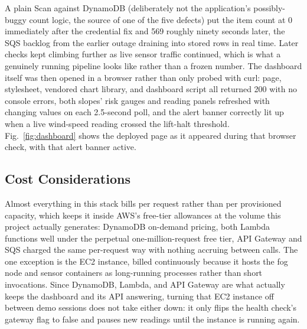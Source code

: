 \documentclass[conference]{IEEEtran}
\begin{document}
A plain Scan against DynamoDB (deliberately not the application's possibly-buggy count logic, the source of one of the five defects) put the item count at 0 immediately after the credential fix and 569 roughly ninety seconds later, the SQS backlog from the earlier outage draining into stored rows in real time. Later checks kept climbing further as live sensor traffic continued, which is what a genuinely running pipeline looks like rather than a frozen number. The dashboard itself was then opened in a browser rather than only probed with curl: page, stylesheet, vendored chart library, and dashboard script all returned 200 with no console errors, both slopes' risk gauges and reading panels refreshed with changing values on each 2.5-second poll, and the alert banner correctly lit up when a live wind-speed reading crossed the lift-halt threshold. Fig.~\ref{fig:dashboard} shows the deployed page as it appeared during that browser check, with that alert banner active.

\subsection{Cost Considerations}
Almost everything in this stack bills per request rather than per provisioned capacity, which keeps it inside AWS's free-tier allowances at the volume this project actually generates: DynamoDB on-demand pricing, both Lambda functions well under the perpetual one-million-request free tier, API Gateway and SQS charged the same per-request way with nothing accruing between calls. The one exception is the EC2 instance, billed continuously because it hosts the fog node and sensor containers as long-running processes rather than short invocations. Since DynamoDB, Lambda, and API Gateway are what actually keeps the dashboard and its API answering, turning that EC2 instance off between demo sessions does not take either down: it only flips the health check's gateway flag to false and pauses new readings until the instance is running again.
\end{document}
